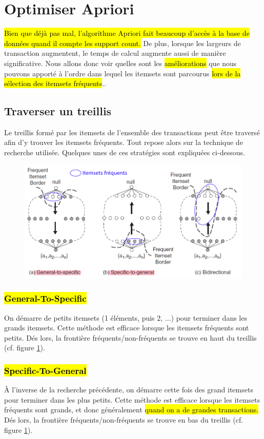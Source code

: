 \documentclass[letterpaper, 12pt]{article}
\newcommand{\alinea}{
\hspace*{0.5cm}}
\begin{document}
	\section{Optimiser Apriori}
		\alinea \hl{Bien que déjà pas mal, l'algorithme Apriori fait beaucoup
			d'accès à la base de données quand il compte les support count.}
			De plus, lorsque les largeurs de transaction augmentent, le
			temps de calcul augmente aussi de manière significative.
			Nous allons donc voir quelles sont les \hl{améliorations} 
			que nous pouvons apporté à l'ordre dans lequel les itemsets
			sont parcourus \hl{lors de la sélection des itemsets fréquents}..
		\subsection{Traverser un treillis}
			\alinea Le treillis formé par les itemsets de l'ensemble des 
				transactions peut être traversé afin d'y trouver les 
				itemsets fréquents. Tout repose alors sur la technique
				de recherche utilisée. Quelques unes de ces stratégies 
				sont expliquées ci-dessous.
			\begin{figure}[H]
				\centering
				\includegraphics[scale=0.65]{Images/lattice_1.PNG}
				\caption{}
				\label{fig:lattice:1}
			\end{figure}\noindent
			\subsubsection{\hl{General-To-Specific}}
				\alinea On démarre de petits itemsets 
					(1 éléments, puis 2, ...) pour terminer dans les
					grands itemsets.
					Cette méthode est efficace lorsque les itemsets 
					fréquents sont petits. Dés lors, la frontière
					fréquents/non-fréquents se trouve en haut du treillis
					(cf. figure \ref{fig:lattice:1}).
			\subsubsection{\hl{Specific-To-General}}
				\alinea \`A l'inverse de la recherche précédente, on 
					démarre cette fois des grand itemsets pour terminer
					dans les plus petits. Cette méthode est efficace 
					lorsque les itemsets fréquents sont grands, et donc
					généralement \hl{quand on a de grandes transactions.} 
					Dés lors, la frontière
					fréquents/non-fréquents se trouve en bas du treillis
					(cf. figure \ref{fig:lattice:1}).
\end{document}
